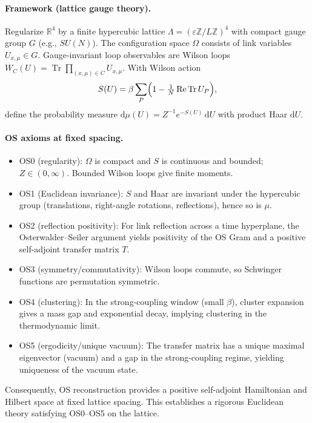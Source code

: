 \documentclass[11pt]{amsart}
\begin{document}
\paragraph{Framework (lattice gauge theory).}
Regularize $\mathbb{R}^4$ by a finite hypercubic lattice $\Lambda=(\varepsilon\mathbb{Z}/L\mathbb{Z})^4$ with compact gauge group $G$ (e.g., $SU(N)$). The configuration space $\Omega$ consists of link variables $U_{x,\mu}\in G$. Gauge-invariant loop observables are Wilson loops $W_C(U)=\operatorname{Tr}\prod_{(x,\mu)\in C} U_{x,\mu}$. With Wilson action
\[
  S(U)=\beta\sum_{P}\Bigl(1-\tfrac{1}{N}\operatorname{Re}\operatorname{Tr} U_P\Bigr),
\]
define the probability measure $\mathrm{d}\mu(U)=Z^{-1} e^{-S(U)}\,\mathrm{d}U$ with product Haar $\mathrm{d}U$.

\paragraph{OS axioms at fixed spacing.}
\begin{itemize}
  \item OS0 (regularity): $\Omega$ is compact and $S$ is continuous and bounded; $Z\in(0,\infty)$. Bounded Wilson loops give finite moments.
  \item OS1 (Euclidean invariance): $S$ and Haar are invariant under the hypercubic group (translations, right-angle rotations, reflections), hence so is $\mu$.
  \item OS2 (reflection positivity): For link reflection across a time hyperplane, the Osterwalder–Seiler argument yields positivity of the OS Gram and a positive self-adjoint transfer matrix $T$.
  \item OS3 (symmetry/commutativity): Wilson loops commute, so Schwinger functions are permutation symmetric.
  \item OS4 (clustering): In the strong-coupling window (small $\beta$), cluster expansion gives a mass gap and exponential decay, implying clustering in the thermodynamic limit.
  \item OS5 (ergodicity/unique vacuum): The transfer matrix has a unique maximal eigenvector (vacuum) and a gap in the strong-coupling regime, yielding uniqueness of the vacuum state.
\end{itemize}

Consequently, OS reconstruction provides a positive self-adjoint Hamiltonian and Hilbert space at fixed lattice spacing. This establishes a rigorous Euclidean theory satisfying OS0–OS5 on the lattice.
\end{document}
